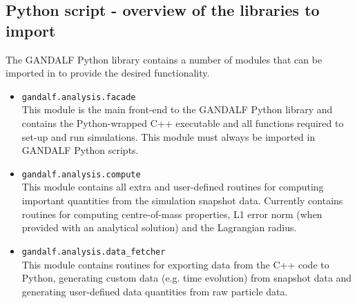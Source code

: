 \documentclass[a4paper]{article}
\begin{document}

\subsection{Python script - overview of the libraries to import}
The GANDALF Python library contains a number of modules that can be imported in to provide the desired functionality.
\begin{itemize}
\item \lstinline[columns=fixed]{gandalf.analysis.facade} \\
\noindent This module is the main front-end to the GANDALF Python library and contains the Python-wrapped C++ executable and all functions required to set-up and run simulations.  This module must always be imported in GANDALF Python scripts.
\item \lstinline{gandalf.analysis.compute} \\
\noindent This module contains all extra and user-defined routines for computing important quantities from the simulation snapshot data.  Currently contains routines for computing centre-of-mass properties, L1 error norm (when provided with an analytical solution) and the Lagrangian radius.
\item \lstinline{gandalf.analysis.data_fetcher} \\
This module contains routines for exporting data from the C++ code to Python, generating custom data (e.g. time evolution) from snapshot data and generating user-defined data quantities from raw particle data.
\end{itemize}




\end{document}
